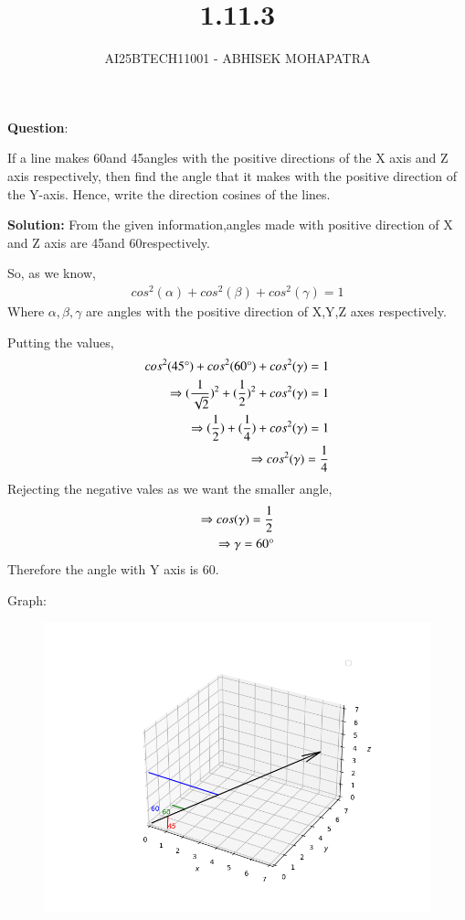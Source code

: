 \documentclass[journal]{IEEEtran}
\renewcommand{\thefigure}{\theenumi}
\renewcommand{\thetable}{\theenumi}
\numberwithin{equation}{enumi}
\numberwithin{figure}{enumi}
\renewcommand{\thetable}{\theenumi}
\begin{document}

\vspace{3cm}

\title{1.11.3}
\author{AI25BTECH11001 - ABHISEK MOHAPATRA}
{\let\newpage\relax\maketitle}
\renewcommand{\thefigure}{\theenumi}
\renewcommand{\thetable}{\theenumi}

		\textbf{Question}:

		\noindent If a line makes 60\degree and 45\degree angles with the positive directions of the X axis and Z axis respectively, then find the angle that it makes with the positive direction of the Y-axis. Hence, write the direction cosines of the lines.

		\textbf{Solution:} From the given information,angles made with positive direction of X and Z axis are 45\degree and 60\degree respectively.
		
		So, as we know,
		\begin{align}
			cos^2(\alpha) + cos^2(\beta) + cos^2(\gamma) = 1 
		\end{align}
		Where $\alpha,\beta,\gamma$ are angles with the positive direction of X,Y,Z axes respectively.


		Putting the values, 
		\begin{align}
			cos^2(45\degree) + cos^2(60\degree) + cos^2(\gamma) = 1 
			\\
			\Rightarrow	(\frac{1}{\sqrt{2}})^2 + (\frac{1}{2})^2 + cos^2(\gamma) = 1
			\\
			\Rightarrow	(\frac{1}{{2}}) + (\frac{1}{4}) + cos^2(\gamma) = 1
			\\
			\Rightarrow	cos^2(\gamma) = \frac{1}{4}
		\end{align}
		Rejecting the negative vales as we want the smaller angle,
		\begin{align}
			\Rightarrow	cos(\gamma) = \frac{1}{2}
			\\
			\Rightarrow     \gamma = 60\degree
		\end{align}
		Therefore the angle with Y axis is 60\degree.

		Graph:
		\begin{figure}[H]
			\centering
			\includegraphics{img}
			\caption*{}
		\label{img}
		\end{figure}
\end{document}
